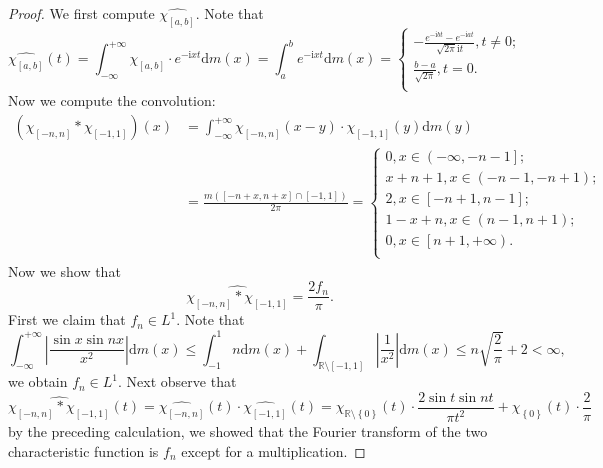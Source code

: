 \begin{proof}
We first compute $\widehat{\chi_{[a,b]}}$. Note that 
$$
\widehat{\chi _{\left[ a,b \right]}}\left( t \right) =\int_{-\infty}^{+\infty}{\chi _{\left[ a,b \right]}\cdot e^{-\mathrm{i}xt}\mathrm{d}m\left( x \right)}=\int_a^b{e^{-\mathrm{i}xt}\mathrm{d}m\left( x \right)}=\begin{cases}
	-\frac{e^{-\mathrm{i}bt}-e^{-\mathrm{i}at}}{\sqrt{2\pi}\mathrm{i}t},t\ne 0;\\
	\frac{b-a}{\sqrt{2\pi}},t=0.\\
\end{cases}
$$
Now we compute the convolution: 
$$
\begin{aligned}
\left( \chi _{\left[ -n,n \right]}*\chi _{\left[ -1,1 \right]} \right) \left( x \right) &=\int_{-\infty}^{+\infty}{\chi _{\left[ -n,n \right]}\left( x-y \right) \cdot \chi _{\left[ -1,1 \right]}\left( y \right) \mathrm{d}m\left( y \right)}
\\
&=\frac{m\left( \left[ -n+x,n+x \right] \cap \left[ -1,1 \right] \right)}{2\pi}=\begin{cases}
	0,x\in \left( -\infty ,-n-1 \right] ;\\
	x+n+1,x\in \left( -n-1,-n+1 \right) ;\\
	2,x\in \left[ -n+1,n-1 \right] ;\\
	1-x+n,x\in \left( n-1,n+1 \right) ;\\
	0,x\in \left[ n+1,+\infty \right) .\\
\end{cases}
\end{aligned}
$$
Now we show that 
$$
\widehat{\chi _{\left[ -n,n \right]}*\chi _{\left[ -1,1 \right]}}=\frac{2f_n}{\pi}.
$$
First we claim that $f_n\in L^1$. Note that 
$$
\int_{-\infty}^{+\infty}{\left| \frac{\sin x\sin nx}{x^2} \right|\mathrm{d}m\left( x \right)}\le \int_{-1}^1{n\mathrm{d}m\left( x \right)}+\int_{\mathbb{R} \setminus \left[ -1,1 \right]}{\left| \frac{1}{x^2} \right|\mathrm{d}m\left( x \right)}\le n\sqrt{\frac{2}{\pi}}+2<\infty ,
$$
we obtain $f_n\in L^1$. Next observe that 
$$
\widehat{\chi _{\left[ -n,n \right]}*\chi _{\left[ -1,1 \right]}}\left( t \right) =\widehat{\chi _{\left[ -n,n \right]}}\left( t \right) \cdot \widehat{\chi _{\left[ -1,1 \right]}}\left( t \right) =\chi _{\mathbb{R} \setminus \left\{ 0 \right\}}\left( t \right) \cdot \frac{2\sin t\sin nt}{\pi t^2}+\chi _{\left\{ 0 \right\}}\left( t \right) \cdot \frac{2}{\pi}
$$
by the preceding calculation, we showed that the Fourier transform of the two characteristic function is $f_n$ except for a multiplication.\par

\end{proof}
